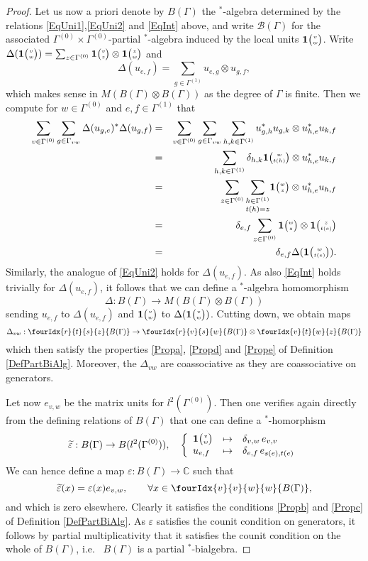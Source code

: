 \documentclass[10pt]{article}
\newcommand{\C}{\mathbb{C}}
\newcommand{\Grt}[3]{#1{\tiny{\begin{pmatrix} #2\\#3\end{pmatrix}}}}
\newcommand{\UnitC}[2]{\Grt{\mathbf{1}}{#1}{#2}}
\newcommand{\Gr}[5]{\fourIdx{#2}{#4}{#3}{#5}{#1}}%
\theoremstyle{definition}
\numberwithin{equation}{section}
\begin{document}
\begin{proof}
Let us now a priori denote by $B(\Gamma)$ the $^*$-algebra determined by the relations \eqref{EqUni1},\eqref{EqUni2} and \eqref{EqInt} above, and write $\mathscr{B}(\Gamma)$ for the associated $\Gamma^{(0)}\times \Gamma^{(0)}$-partial $^*$-algebra induced by the local units $\UnitC{v}{w}$. Write $\Delta(\UnitC{v}{w}) = \sum_{z\in \Gamma^{(0)}} \UnitC{v}{z}\otimes \UnitC{z}{w}$ and \[\Delta(u_{e,f}) = \sum_{g\in \Gamma^{(1)}} u_{e,g}\otimes u_{g,f},\] which makes sense in $M(B(\Gamma)\otimes B(\Gamma))$ as the degree of $\Gamma$ is finite. Then we compute for $w\in \Gamma^{(0)}$ and $e,f\in \Gamma^{(1)}$ that \begin{eqnarray*} \sum_{v\in \Gamma^{(0)}}\sum_{g\in \Gamma_{vw}}\Delta(u_{g,e})^*\Delta(u_{g,f}) &=& \sum_{v\in \Gamma^{(0)}}\sum_{g\in \Gamma_{vw}} \sum_{h,k\in \Gamma^{(1)}} u_{g,h}^*u_{g,k}\otimes u_{h,e}^*u_{k,f}\\ &=& \sum_{h,k\in \Gamma^{(1)}} \delta_{h,k} \UnitC{w}{t(h)}\otimes u_{h,e}^*u_{k,f}\\ &=&  \sum_{z\in \Gamma^{(0)}}\underset{t(h)=z}{\sum_{h\in \Gamma^{(1)}}} \UnitC{w}{z}\otimes u_{h,e}^*u_{h,f} \\ &=& \delta_{e,f} \sum_{z\in \Gamma^{(0)}} \UnitC{w}{z}\otimes \UnitC{z}{t(e)}\\ &=& \delta_{e,f} \Delta(\UnitC{w}{t(e)}).\end{eqnarray*}  Similarly, the analogue of \eqref{EqUni2} holds for $\Delta(u_{e,f})$. As also \eqref{EqInt} holds trivially for $\Delta(u_{e,f})$, it follows that we can define a $^*$-algebra homomorphism \[\Delta:B(\Gamma)\rightarrow M(B(\Gamma)\otimes B(\Gamma))\] sending $u_{e,f}$ to $\Delta(u_{e,f})$ and $\UnitC{v}{w}$ to $\Delta(\UnitC{v}{w})$. Cutting down, we obtain maps \[\Delta_{vw}:\Gr{B(\Gamma)}{r}{s}{t}{z}\rightarrow \Gr{B(\Gamma)}{r}{s}{v}{w}\otimes \Gr{B(\Gamma)}{v}{w}{t}{z}\] which then satisfy the properties \ref{Propa}, \ref{Propd} and \ref{Prope} of Definition \ref{DefPartBiAlg}. Moreover, the $\Delta_{vw}$ are coassociative as they are coassociative on generators.

Let now $e_{v,w}$ be the matrix units for $l^2(\Gamma^{(0)})$. Then one verifies again directly from the defining relations of $B(\Gamma)$ that one can define a $^*$-homorphism \[\widetilde{\varepsilon}: B(\Gamma)\rightarrow B(l^2(\Gamma^{(0)})),\quad \left\{\begin{array}{lll} \UnitC{v}{w}&\mapsto &\delta_{v,w}\, e_{v,v}\\ u_{e,f}&\mapsto& \delta_{e,f}\, e_{s(e),t(e)}\end{array}\right.\] We can hence define a map $\varepsilon: B(\Gamma)\rightarrow \C$ such that \[\widetilde{\varepsilon}(x) = \varepsilon(x) e_{v,w},\qquad  \forall x\in \Gr{B(\Gamma)}{v}{w}{v}{w},\] and which is zero elsewhere. Clearly it satisfies the conditions \ref{Propb} and \ref{Propc} of Definition \ref{DefPartBiAlg}. As $\varepsilon$ satisfies the counit condition on generators, it follows by partial multiplicativity that it satisfies the counit condition on the whole of $B(\Gamma)$, i.e.~ $B(\Gamma)$ is a partial $^*$-bialgebra. 


\end{proof}
\end{document}
